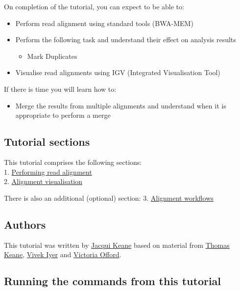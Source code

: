 \documentclass[11pt]{article}
\providecommand{\tightlist}{%
      \setlength{\itemsep}{0pt}\setlength{\parskip}{0pt}}
\begin{document}
On completion of the tutorial, you can expect to be able to:

\begin{itemize}
\tightlist
\item
  Perform read alignment using standard tools (BWA-MEM)
\item
  Perform the following task and understand their effect on analysis
  results

  \begin{itemize}
  \tightlist
  \item
    Mark Duplicates
  \end{itemize}
\item
  Visualise read alignments using IGV (Integrated Visualisation Tool)
\end{itemize}

If there is time you will learn how to:

\begin{itemize}
\tightlist
\item
  Merge the results from multiple alignments and understand when it is
  appropriate to perform a merge
\end{itemize}

\hypertarget{tutorial-sections}{%
\subsection{Tutorial sections}\label{tutorial-sections}}

This tutorial comprises the following sections:\\
1. \href{alignment.ipynb}{Performing read alignment}\\
2. \href{visualisation.ipynb}{Alignment visualisation}

There is also an additional (optional) section: 3.
\href{workflows.ipynb}{Alignment workflows}

\hypertarget{authors}{%
\subsection{Authors}\label{authors}}

This tutorial was written by
\href{https://github.com/jacquikeane}{Jacqui Keane} based on material
from \href{https://github.com/tk2}{Thomas Keane},
\href{https://github.com/vviyer}{Vivek Iyer} and
\href{https://github.com/vo1}{Victoria Offord}.

\hypertarget{running-the-commands-from-this-tutorial}{%
\subsection{Running the commands from this
tutorial}\label{running-the-commands-from-this-tutorial}}
\end{document}
